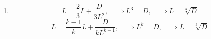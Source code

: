 \documentclass[11pt,a4paper,titlepage,oneside,openany]{article}
\numberwithin{equation}{section}
\numberwithin{algorithm}{section}
\numberwithin{figure}{section}
\numberwithin{table}{section}
\begin{document}
\begin{enumerate}
\item
\begin{equation*}
  L=\frac{2}{3}L+\frac{D}{3L^2}, \quad \Rightarrow L^3=D,\quad \Rightarrow L=\sqrt[3]{D}
\end{equation*}
\begin{equation*}
  L=\frac{k-1}{k}L+\frac{D}{k L^{k-1}}, \quad \Rightarrow L^k=D,\quad \Rightarrow L=\sqrt[k]{D}
\end{equation*}
\end{enumerate}
\end{document}
